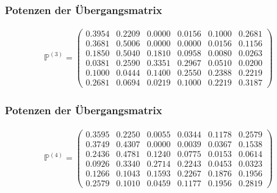 \documentclass[compress]{beamer}
\begin{document}
	\begin{frame}
		\frametitle{Potenzen der Übergangsmatrix}
		\begin{center}
			\begin{align*}
				\mathbb{P} ^{(3)} =
				\begin{pmatrix} 
				  0.3954 &  0.2209 &  0.0000 &  0.0156 &  0.1000 &  0.2681\\
				  0.3681 &  0.5006 &  0.0000 &  0.0000 &  0.0156 &  0.1156\\
				  0.1850 &  0.5040 &  0.1810 &  0.0958 &  0.0080 &  0.0263\\
				  0.0381 &  0.2590 &  0.3351 &  0.2967 &  0.0510 &  0.0200\\
				  0.1000 &  0.0444 &  0.1400 &  0.2550 &  0.2388 &  0.2219\\
				  0.2681 &  0.0694 &  0.0219 &  0.1000 &  0.2219 &  0.3187
				\end{pmatrix} 
			\end{align*}
		\end{center}
	\end{frame}


	\begin{frame}
		\frametitle{Potenzen der Übergangsmatrix}
		\begin{center}
			\begin{align*}
				\mathbb{P} ^{(4)} =
				\begin{pmatrix} 
				  0.3595 &  0.2250 &  0.0055 &  0.0344 &  0.1178 &  0.2579\\
				  0.3749 &  0.4307 &  0.0000 &  0.0039 &  0.0367 &  0.1538\\
				  0.2436 &  0.4781 &  0.1240 &  0.0775 &  0.0153 &  0.0614\\
				  0.0926 &  0.3340 &  0.2714 &  0.2243 &  0.0453 &  0.0323\\
				  0.1266 &  0.1043 &  0.1593 &  0.2267 &  0.1876 &  0.1956\\
				  0.2579 &  0.1010 &  0.0459 &  0.1177 &  0.1956 &  0.2819
				\end{pmatrix} 
			\end{align*}
		\end{center}
	\end{frame}
\end{document}
